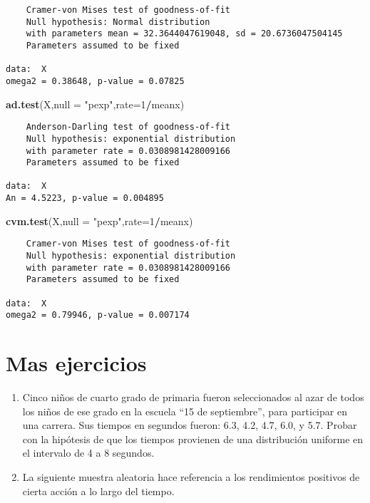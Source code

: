 \documentclass[
  a4paper,
  oneside,
  openany]{book}
\newenvironment{Shaded}{\begin{snugshade}}{\end{snugshade}}
\newcommand{\DataTypeTok}[1]{\textcolor[rgb]{0.13,0.29,0.53}{#1}}
\newcommand{\DecValTok}[1]{\textcolor[rgb]{0.00,0.00,0.81}{#1}}
\newcommand{\KeywordTok}[1]{\textcolor[rgb]{0.13,0.29,0.53}{\textbf{#1}}}
\newcommand{\NormalTok}[1]{#1}
\newcommand{\OperatorTok}[1]{\textcolor[rgb]{0.81,0.36,0.00}{\textbf{#1}}}
\newcommand{\StringTok}[1]{\textcolor[rgb]{0.31,0.60,0.02}{#1}}
\begin{document}
\begin{verbatim}
    Cramer-von Mises test of goodness-of-fit
    Null hypothesis: Normal distribution
    with parameters mean = 32.3644047619048, sd = 20.6736047504145
    Parameters assumed to be fixed

data:  X
omega2 = 0.38648, p-value = 0.07825
\end{verbatim}

\begin{Shaded}
\begin{Highlighting}[]
\KeywordTok{ad.test}\NormalTok{(X,}\DataTypeTok{null =} \StringTok{"pexp"}\NormalTok{,}\DataTypeTok{rate=}\DecValTok{1}\OperatorTok{/}\NormalTok{meanx)}
\end{Highlighting}
\end{Shaded}

\begin{verbatim}
    Anderson-Darling test of goodness-of-fit
    Null hypothesis: exponential distribution
    with parameter rate = 0.0308981428009166
    Parameters assumed to be fixed

data:  X
An = 4.5223, p-value = 0.004895
\end{verbatim}

\begin{Shaded}
\begin{Highlighting}[]
\KeywordTok{cvm.test}\NormalTok{(X,}\DataTypeTok{null =} \StringTok{"pexp"}\NormalTok{,}\DataTypeTok{rate=}\DecValTok{1}\OperatorTok{/}\NormalTok{meanx)}
\end{Highlighting}
\end{Shaded}

\begin{verbatim}
    Cramer-von Mises test of goodness-of-fit
    Null hypothesis: exponential distribution
    with parameter rate = 0.0308981428009166
    Parameters assumed to be fixed

data:  X
omega2 = 0.79946, p-value = 0.007174
\end{verbatim}

\hypertarget{mas-ejercicios}{%
\section{Mas ejercicios}\label{mas-ejercicios}}

\begin{enumerate}
\def\labelenumi{\arabic{enumi}.}
\item
  Cinco niños de cuarto grado de primaria fueron seleccionados al azar de todos los niños de ese grado en la escuela ``15 de septiembre'', para participar en una carrera. Sus tiempos en segundos fueron: 6.3, 4.2, 4.7, 6.0, y 5.7. Probar con la hipótesis de que los tiempos provienen de una distribución uniforme en el intervalo de 4 a 8 segundos.
\item
  La siguiente muestra aleatoria hace referencia a los rendimientos positivos de cierta acción a lo largo del tiempo.
\end{enumerate}
\end{document}
